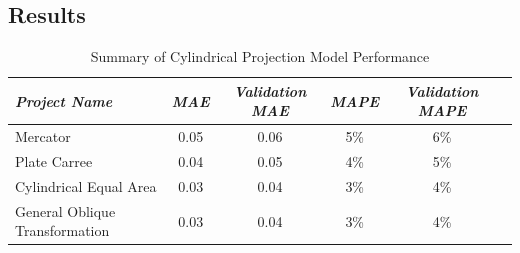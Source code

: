 \subsection{Results}
\begin{table}[ht]
    \centering
    \caption{Summary of Cylindrical Projection Model Performance}
    \label{cylindrical_results_table}
    \renewcommand{\arraystretch}{1.2} %
    \begin{tabular}{|l|c|c|c|c|c|}
        \hline
        \rowcolor[gray]{0.9}
        \textbf{\emph{Project Name}}   & \textbf{\emph{MAE}} & \textbf{\emph{Validation MAE}} & \textbf{\emph{MAPE}} & \textbf{\emph{Validation MAPE}} \\ \hline
        Mercator                       & 0.05                & 0.06                           & 5\%                  & 6\%                             \\ \hline
        Plate Carree                   & 0.04                & 0.05                           & 4\%                  & 5\%                             \\ \hline
        Cylindrical Equal Area         & 0.03                & 0.04                           & 3\%                  & 4\%                             \\ \hline
        General Oblique Transformation & 0.03                & 0.04                           & 3\%                  & 4\%                             \\ \hline
    \end{tabular}


\end{table}